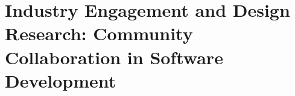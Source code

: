 
\chapter{Industry Engagement and Design Research: Community Collaboration in Software Development} %

\label{Chapter4} %



